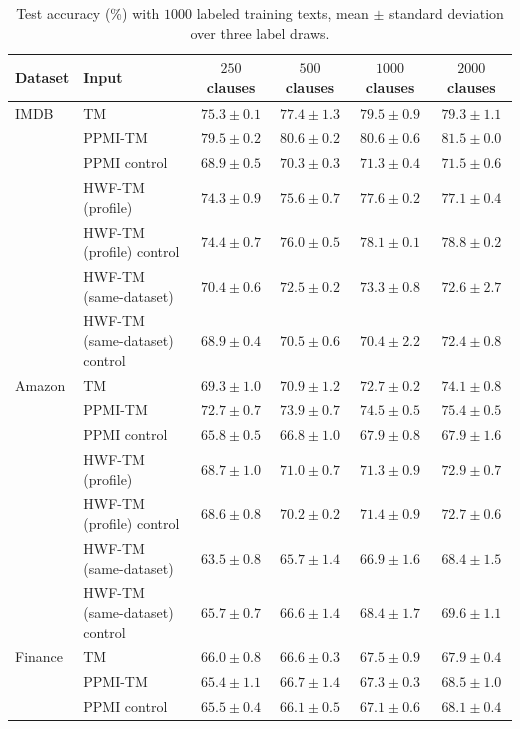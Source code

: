 \begin{table}[H]
\centering
\small
\setlength{\tabcolsep}{4pt}
\caption{Test accuracy (\%) with $1000$ labeled training texts, mean $\pm$ standard deviation over
three label draws.}
\label{tab:app-n1000-accuracy}
\begin{tabular}{llcccc}
\toprule
Dataset & Input & $250$ clauses & $500$ clauses & $1000$ clauses & $2000$ clauses \\
\midrule
IMDB & TM & $75.3 \pm 0.1$ & $77.4 \pm 1.3$ & $79.5 \pm 0.9$ & $79.3 \pm 1.1$ \\
 & PPMI-TM & $79.5 \pm 0.2$ & $80.6 \pm 0.2$ & $80.6 \pm 0.6$ & $81.5 \pm 0.0$ \\
 & PPMI control & $68.9 \pm 0.5$ & $70.3 \pm 0.3$ & $71.3 \pm 0.4$ & $71.5 \pm 0.6$ \\
 & HWF-TM (profile) & $74.3 \pm 0.9$ & $75.6 \pm 0.7$ & $77.6 \pm 0.2$ & $77.1 \pm 0.4$ \\
 & HWF-TM (profile) control & $74.4 \pm 0.7$ & $76.0 \pm 0.5$ & $78.1 \pm 0.1$ & $78.8 \pm 0.2$ \\
 & HWF-TM (same-dataset) & $70.4 \pm 0.6$ & $72.5 \pm 0.2$ & $73.3 \pm 0.8$ & $72.6 \pm 2.7$ \\
 & HWF-TM (same-dataset) control & $68.9 \pm 0.4$ & $70.5 \pm 0.6$ & $70.4 \pm 2.2$ & $72.4 \pm 0.8$ \\
\midrule
Amazon & TM & $69.3 \pm 1.0$ & $70.9 \pm 1.2$ & $72.7 \pm 0.2$ & $74.1 \pm 0.8$ \\
 & PPMI-TM & $72.7 \pm 0.7$ & $73.9 \pm 0.7$ & $74.5 \pm 0.5$ & $75.4 \pm 0.5$ \\
 & PPMI control & $65.8 \pm 0.5$ & $66.8 \pm 1.0$ & $67.9 \pm 0.8$ & $67.9 \pm 1.6$ \\
 & HWF-TM (profile) & $68.7 \pm 1.0$ & $71.0 \pm 0.7$ & $71.3 \pm 0.9$ & $72.9 \pm 0.7$ \\
 & HWF-TM (profile) control & $68.6 \pm 0.8$ & $70.2 \pm 0.2$ & $71.4 \pm 0.9$ & $72.7 \pm 0.6$ \\
 & HWF-TM (same-dataset) & $63.5 \pm 0.8$ & $65.7 \pm 1.4$ & $66.9 \pm 1.6$ & $68.4 \pm 1.5$ \\
 & HWF-TM (same-dataset) control & $65.7 \pm 0.7$ & $66.6 \pm 1.4$ & $68.4 \pm 1.7$ & $69.6 \pm 1.1$ \\
\midrule
Finance & TM & $66.0 \pm 0.8$ & $66.6 \pm 0.3$ & $67.5 \pm 0.9$ & $67.9 \pm 0.4$ \\
 & PPMI-TM & $65.4 \pm 1.1$ & $66.7 \pm 1.4$ & $67.3 \pm 0.3$ & $68.5 \pm 1.0$ \\
 & PPMI control & $65.5 \pm 0.4$ & $66.1 \pm 0.5$ & $67.1 \pm 0.6$ & $68.1 \pm 0.4$ \\

\end{tabular}
\end{table}
